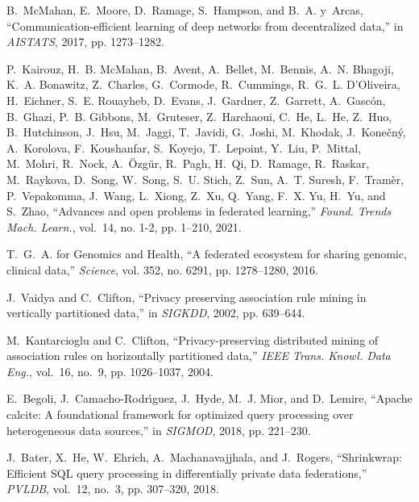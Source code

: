 \documentclass[11pt]{article}
\begin{document}
\begin{thebibliography}{10}
B.~McMahan, E.~Moore, D.~Ramage, S.~Hampson, and B.~A. y~Arcas,
  ``Communication-efficient learning of deep networks from decentralized
  data,'' in \emph{{AISTATS}}, 2017, pp. 1273--1282.

P.~Kairouz, H.~B. McMahan, B.~Avent, A.~Bellet, M.~Bennis, A.~N. Bhagoji, K.~A.
  Bonawitz, Z.~Charles, G.~Cormode, R.~Cummings, R.~G.~L. D'Oliveira,
  H.~Eichner, S.~E. Rouayheb, D.~Evans, J.~Gardner, Z.~Garrett,
  A.~Gasc{\'{o}}n, B.~Ghazi, P.~B. Gibbons, M.~Gruteser, Z.~Harchaoui, C.~He,
  L.~He, Z.~Huo, B.~Hutchinson, J.~Hsu, M.~Jaggi, T.~Javidi, G.~Joshi,
  M.~Khodak, J.~Kone{\v{c}}n{\'y}, A.~Korolova, F.~Koushanfar, S.~Koyejo,
  T.~Lepoint, Y.~Liu, P.~Mittal, M.~Mohri, R.~Nock, A.~{\"{O}}zg{\"{u}}r,
  R.~Pagh, H.~Qi, D.~Ramage, R.~Raskar, M.~Raykova, D.~Song, W.~Song, S.~U.
  Stich, Z.~Sun, A.~T. Suresh, F.~Tram{\`{e}}r, P.~Vepakomma, J.~Wang,
  L.~Xiong, Z.~Xu, Q.~Yang, F.~X. Yu, H.~Yu, and S.~Zhao, ``Advances and open
  problems in federated learning,'' \emph{Found. Trends Mach. Learn.}, vol.~14,
  no. 1-2, pp. 1--210, 2021.

T.~G.~A. for Genomics and Health, ``A federated ecosystem for sharing genomic,
  clinical data,'' \emph{Science}, vol. 352, no. 6291, pp. 1278--1280, 2016.

J.~Vaidya and C.~Clifton, ``Privacy preserving association rule mining in
  vertically partitioned data,'' in \emph{{SIGKDD}}, 2002, pp. 639--644.

M.~Kantarcioglu and C.~Clifton, ``Privacy-preserving distributed mining of
  association rules on horizontally partitioned data,'' \emph{{IEEE} Trans.
  Knowl. Data Eng.}, vol.~16, no.~9, pp. 1026--1037, 2004.

E.~Begoli, J.~Camacho{-}Rodr{\'{\i}}guez, J.~Hyde, M.~J. Mior, and D.~Lemire,
  ``Apache {c}alcite: {A} foundational framework for optimized query processing
  over heterogeneous data sources,'' in \emph{{SIGMOD}}, 2018, pp. 221--230.

J.~Bater, X.~He, W.~Ehrich, A.~Machanavajjhala, and J.~Rogers, ``Shrinkwrap:
  Efficient {SQL} query processing in differentially private data
  federations,'' \emph{{PVLDB}}, vol.~12, no.~3, pp. 307--320, 2018.


\end{thebibliography}
\end{document}
